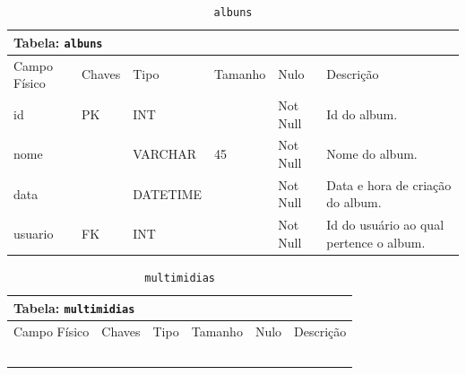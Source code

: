 \documentclass[12pt,a4paper]{article}
\begin{document}
\begin{center}
\begin{table}[h!]
	\caption{\texttt{albuns}}
	\label{tabela:albuns}
	\begin{tabular}{|p{2.5cm}|p{1cm}|p{1.25cm}|p{1.75cm}|p{1.25cm}|p{5cm}|}\hline	
		\multicolumn{6}{|p{16cm}|}{\cellcolor{cinzaClaro}  \centering Tabela: \texttt{albuns}} \\ \hline %
		{\small Campo Físico}   & {\small Chaves} & {\small Tipo} & {\small Tamanho} & {\small Nulo} & {\small Descrição}\\\hline %
		
		{\tiny id} & {\tiny PK} & {\tiny INT} & {\tiny } & {\tiny Not Null} &{\tiny Id do album.}\\\hline
		{\tiny nome} & {\tiny } & {\tiny VARCHAR} & {\tiny 45} & {\tiny Not Null} &{\tiny Nome do album.}\\\hline
		{\tiny data} & {\tiny } & {\tiny DATETIME} & {\tiny } & {\tiny Not Null} &{\tiny Data e hora de criação do album.}\\\hline
		{\tiny usuario} & {\tiny FK} & {\tiny INT} & {\tiny } & {\tiny Not Null} &{\tiny Id do usuário ao qual pertence o album.}\\\hline
			
	\end{tabular}
\end{table}	
\end{center}


\begin{center}
\begin{table}[h!]
	\caption{\texttt{multimidias}}
	\label{tabela:multimidias}
	\begin{tabular}{|p{2.5cm}|p{1cm}|p{1.25cm}|p{1.75cm}|p{1.25cm}|p{5cm}|}\hline	
		\multicolumn{6}{|p{16cm}|}{\cellcolor{cinzaClaro}  \centering Tabela: \texttt{multimidias}} \\ \hline %
		{\small Campo Físico}   & {\small Chaves} & {\small Tipo} & {\small Tamanho} & {\small Nulo} & {\small Descrição}\\\hline %
		
		{\tiny } & {\tiny } & {\tiny } & {\tiny } & {\tiny } &{\tiny }\\\hline
		{\tiny } & {\tiny } & {\tiny } & {\tiny } & {\tiny } &{\tiny }\\\hline
		{\tiny } & {\tiny } & {\tiny } & {\tiny } & {\tiny } &{\tiny }\\\hline
		{\tiny } & {\tiny } & {\tiny } & {\tiny } & {\tiny } &{\tiny }\\\hline
		{\tiny } & {\tiny } & {\tiny } & {\tiny } & {\tiny } &{\tiny }\\\hline
			
	\end{tabular}
\end{table}	
\end{center}
\end{document}
